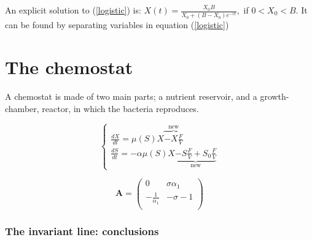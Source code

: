 \documentclass[a4paper, 10pt, twoside, openright]{book}
\begin{document}
An explicit solution to (\ref{logistic}) is: 
$X(t)=\frac{{X}_{0}B}{{X}_{0}+(B-{X}_{0}){e}^{-rt}},$ if $0<{X}_{0}<B$. 
It can be found by separating variables in equation (\ref{logistic})


\section{The chemostat} 

A chemostat is made of two main parts; a nutrient reservoir, and a
growth-chamber, reactor, in which the bacteria reproduces. 

\begin{equation} \label{chemo_basic}
\left\{ \begin{array}{l}
\frac{dX}{dt}= \mu(S)X \overbrace{-X\frac{F}{V}}^{\textrm{new}}  \\
\frac{dS}{dt}=- \alpha \mu(S) X
\underbrace{-S\frac{F}{V}+ {S}_{0}\frac{F}{V}}_{\textrm{new}} 
\end{array}\right.
\end{equation}

\begin{displaymath}
\mathbf{A} =
\left( \begin{array}{cc}
0 &  \sigma {\alpha}_{1}  \\
 - \frac{1}{{\alpha}_{1}} & -\sigma - 1 \\
\end{array}\right)
\end{displaymath}

\subsubsection*{The invariant line: conclusions}




\end{document}
